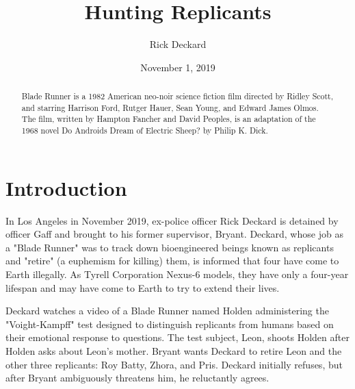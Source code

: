 \documentclass{article}
\title{Hunting Replicants}
\author{Rick Deckard}
\date{November 1, 2019}
\begin{document}
\maketitle

\begin{abstract}
Blade Runner is a 1982 American neo-noir science fiction film directed by Ridley Scott, and starring Harrison Ford, Rutger Hauer, Sean Young, and Edward James Olmos. The film, written by Hampton Fancher and David Peoples, is an adaptation of the 1968 novel Do Androids Dream of Electric Sheep? by Philip K. Dick.
\end{abstract}

\section*{Introduction}

In Los Angeles in November 2019, ex-police officer Rick Deckard is detained by officer Gaff and brought to his former supervisor, Bryant. Deckard, whose job as a "Blade Runner" was to track down bioengineered beings known as replicants and "retire" (a euphemism for killing) them, is informed that four have come to Earth illegally. As Tyrell Corporation Nexus-6 models, they have only a four-year lifespan and may have come to Earth to try to extend their lives.

Deckard watches a video of a Blade Runner named Holden administering the "Voight-Kampff" test designed to distinguish replicants from humans based on their emotional response to questions. The test subject, Leon, shoots Holden after Holden asks about Leon's mother. Bryant wants Deckard to retire Leon and the other three replicants: Roy Batty, Zhora, and Pris. Deckard initially refuses, but after Bryant ambiguously threatens him, he reluctantly agrees.
\end{document}
